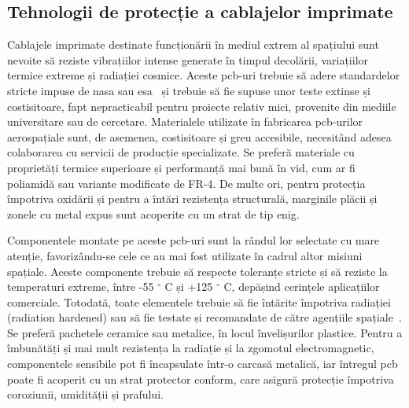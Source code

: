 \documentclass[12pt,a4paper]{report}
\begin{document}
\subsection{Tehnologii de protecție a cablajelor imprimate}
Cablajele imprimate destinate funcționării în mediul extrem al spațiului sunt nevoite să reziste vibrațiilor intense generate în timpul decolării, variațiilor termice extreme și radiației cosmice. Aceste \gls{pcb}-uri trebuie să adere standardelor stricte impuse de \gls{nasa} sau \gls{esa}~\cite{esa_pcb_standards} și trebuie să fie supuse unor teste extinse și costisitoare, fapt nepracticabil pentru proiecte relativ mici, provenite din mediile universitare sau de cercetare. Materialele utilizate în fabricarea \gls{pcb}-urilor aerospațiale sunt, de asemenea, costisitoare și greu accesibile, necesitând adesea colaborarea cu servicii de producție specializate. Se preferă materiale cu proprietăți termice superioare și performanță mai bună în vid, cum ar fi poliamidă sau variante modificate de FR-4. De multe ori, pentru protecția împotriva oxidării și pentru a întări rezistența structurală, marginile plăcii și zonele cu metal expus sunt acoperite cu un strat de tip \gls{enig}.

Componentele montate pe aceste \gls{pcb}-uri sunt la rândul lor selectate cu mare atenție, favorizându-se cele ce au mai fost utilizate în cadrul altor misiuni spațiale. Aceste componente trebuie să respecte toleranțe stricte și să reziste la temperaturi extreme, între -55 $^{\circ}$ C și +125 $^{\circ}$ C, depășind cerințele aplicațiilor comerciale. Totodată, toate elementele trebuie să fie întărite împotriva radiației (radiation hardened) sau să fie testate și recomandate de către agențiile spațiale~\cite{nasa_recomended_parts}. Se preferă pachetele ceramice sau metalice, în locul învelișurilor plastice. Pentru a îmbunătăți și mai mult rezistența la radiație și la zgomotul electromagnetic, componentele sensibile pot fi încapsulate într-o carcasă metalică, iar întregul \gls{pcb} poate fi acoperit cu un strat protector conform, care asigură protecție împotriva coroziunii, umidității și prafului.
\end{document}
